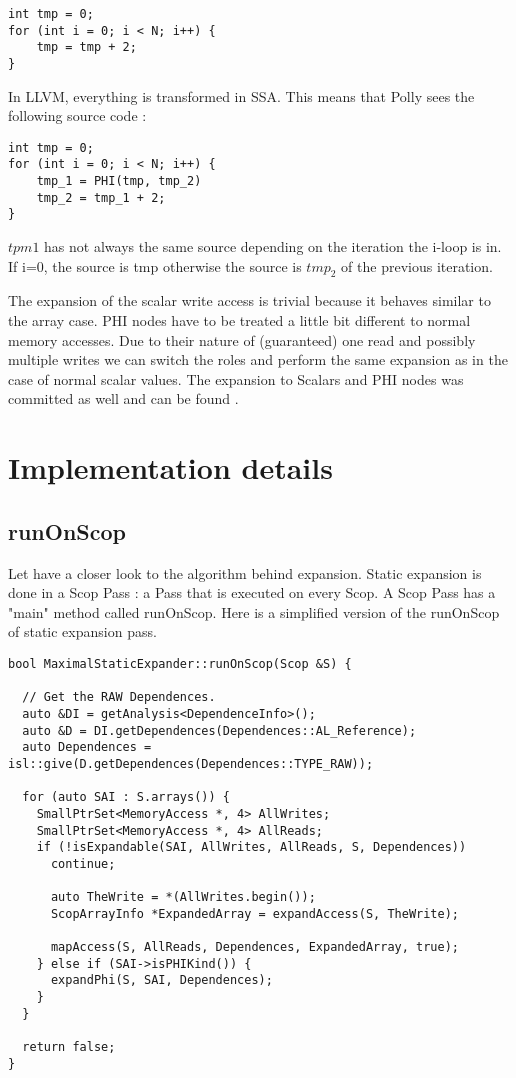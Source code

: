 \begin{lstlisting}[frame=single]
int tmp = 0;
for (int i = 0; i < N; i++) {
    tmp = tmp + 2;
}
\end{lstlisting}

In LLVM, everything is transformed in SSA. This means that Polly sees the following source code :

\begin{lstlisting}[frame=single]
int tmp = 0;
for (int i = 0; i < N; i++) {
    tmp_1 = PHI(tmp, tmp_2)
    tmp_2 = tmp_1 + 2;
}
\end{lstlisting}

$tpm1$ has not always the same source depending on the iteration the i-loop is in. If i=0, the source is tmp otherwise the source is $tmp_2$ of the previous iteration.

The expansion of the scalar write access is trivial because it behaves similar to the array case. PHI nodes have to be treated a little bit different to normal memory accesses. Due to their nature of (guaranteed) one read and possibly multiple writes we can switch the roles and perform the same expansion as in the case of normal scalar values. The expansion to Scalars and PHI nodes was committed as well and can be found .

\section{Implementation details}
\subsection{runOnScop}
Let have a closer look to the algorithm behind expansion. Static expansion is done in a Scop Pass : a Pass that is executed on every Scop. A Scop Pass has a "main" method called runOnScop. Here is a simplified version of the runOnScop of static expansion pass.

\begin{lstlisting}[frame=single]
bool MaximalStaticExpander::runOnScop(Scop &S) {

  // Get the RAW Dependences.
  auto &DI = getAnalysis<DependenceInfo>();
  auto &D = DI.getDependences(Dependences::AL_Reference);
  auto Dependences = isl::give(D.getDependences(Dependences::TYPE_RAW));

  for (auto SAI : S.arrays()) {
    SmallPtrSet<MemoryAccess *, 4> AllWrites;
    SmallPtrSet<MemoryAccess *, 4> AllReads;
    if (!isExpandable(SAI, AllWrites, AllReads, S, Dependences))
      continue;

      auto TheWrite = *(AllWrites.begin());
      ScopArrayInfo *ExpandedArray = expandAccess(S, TheWrite);

      mapAccess(S, AllReads, Dependences, ExpandedArray, true);
    } else if (SAI->isPHIKind()) {
      expandPhi(S, SAI, Dependences);
    }
  }

  return false;
}
\end{lstlisting}

